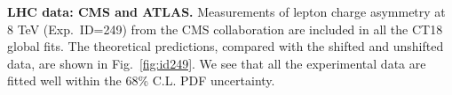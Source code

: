 





%
%
{\bf LHC data: CMS and ATLAS.}
Measurements of lepton charge asymmetry at 8 TeV (Exp.~ID=249) from the CMS collaboration are included  
in all the CT18 global fits. The theoretical predictions, compared with the shifted 
and unshifted data, are shown in Fig.~\ref{fig:id249}. We see that all the 
experimental data are fitted well within the 68\% C.L. PDF uncertainty.  




